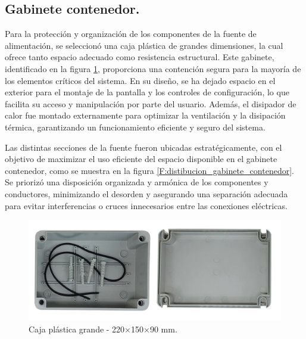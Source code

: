 \subsection{Gabinete contenedor.}
Para la protección y organización de los componentes de la fuente de alimentación, se seleccionó una caja plástica de grandes dimensiones, la cual ofrece tanto espacio adecuado como resistencia estructural. Este gabinete, identificado en la figura \ref{F:gabinete_contenedor}, proporciona una contención segura para la mayoría de los elementos críticos del sistema. En su diseño, se ha dejado espacio en el exterior para el montaje de la pantalla y los controles de configuración, lo que facilita su acceso y manipulación por parte del usuario. Además, el disipador de calor fue montado externamente para optimizar la ventilación y la disipación térmica, garantizando un funcionamiento eficiente y seguro del sistema.\par
Las distintas secciones de la fuente fueron ubicadas estratégicamente, con el objetivo de maximizar el uso eficiente del espacio disponible en el gabinete contenedor, como se muestra en la figura \ref{F:distibucion_gabinete_contenedor}. Se priorizó una disposición organizada y armónica de los componentes y conductores, minimizando el desorden y asegurando una separación adecuada para evitar interferencias o cruces innecesarios entre las conexiones eléctricas.

\begin{figure}[H]
    \centering
    \includegraphics[scale=0.3]{./imagenes/caja_plastica.jpg}
    \caption{Caja plástica grande - 220×150×90 mm.}
    \label{F:gabinete_contenedor}
\end{figure}

